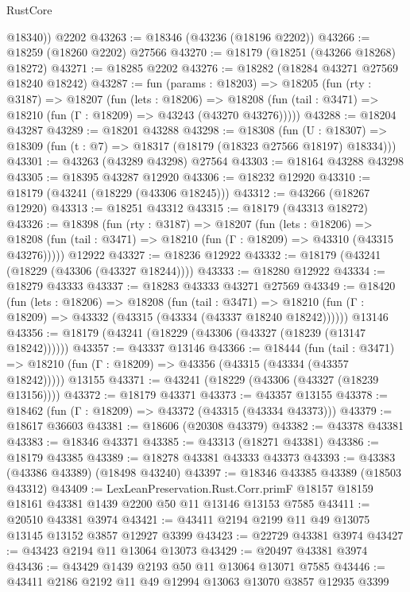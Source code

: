 \begin{lexlean}{RustCore}
\begin{coremodule}
        @18340))
    @2202
@43263 := @18346 (@43236 (@18196 @2202))
@43266 := @18259 (@18260 @2202) @27566
@43270 := @18179 (@18251 (@43266 @18268) @18272)
@43271 := @18285 @2202
@43276 := @18282 (@18284 @43271 @27569 @18240 @18242)
@43287 := fun (params : @18203) =>
  @18205
    (fun (rty : @3187) =>
    @18207
      (fun (lets : @18206) =>
      @18208 (fun (tail : @3471) => @18210 (fun (Γ : @18209) => @43243 (@43270 @43276)))))
@43288 := @18204 @43287
@43289 := @18201 @43288
@43298 := @18308
    (fun (U : @18307) => @18309 (fun (t : @7) => @18317 (@18179 (@18323 @27566 @18197) @18334)))
@43301 := @43263 (@43289 @43298) @27564
@43303 := @18164 @43288 @43298
@43305 := @18395 @43287 @12920
@43306 := @18232 @12920
@43310 := @18179 (@43241 (@18229 (@43306 @18245)))
@43312 := @43266 (@18267 @12920)
@43313 := @18251 @43312
@43315 := @18179 (@43313 @18272)
@43326 := @18398
    (fun (rty : @3187) =>
    @18207
      (fun (lets : @18206) =>
      @18208 (fun (tail : @3471) => @18210 (fun (Γ : @18209) => @43310 (@43315 @43276)))))
    @12922
@43327 := @18236 @12922
@43332 := @18179 (@43241 (@18229 (@43306 (@43327 @18244))))
@43333 := @18280 @12922
@43334 := @18279 @43333
@43337 := @18283 @43333 @43271 @27569
@43349 := @18420
    (fun (lets : @18206) =>
    @18208
      (fun (tail : @3471) =>
      @18210 (fun (Γ : @18209) => @43332 (@43315 (@43334 (@43337 @18240 @18242))))))
    @13146
@43356 := @18179 (@43241 (@18229 (@43306 (@43327 (@18239 (@13147 @18242))))))
@43357 := @43337 @13146
@43366 := @18444
    (fun (tail : @3471) => @18210 (fun (Γ : @18209) => @43356 (@43315 (@43334 (@43357 @18242)))))
    @13155
@43371 := @43241 (@18229 (@43306 (@43327 (@18239 @13156))))
@43372 := @18179 @43371
@43373 := @43357 @13155
@43378 := @18462 (fun (Γ : @18209) => @43372 (@43315 (@43334 @43373)))
@43379 := @18617 @36603
@43381 := @18606 (@20308 @43379)
@43382 := @43378 @43381
@43383 := @18346 @43371
@43385 := @43313 (@18271 @43381)
@43386 := @18179 @43385
@43389 := @18278 @43381 @43333 @43373
@43393 := @43383 (@43386 @43389) (@18498 @43240)
@43397 := @18346 @43385 @43389 (@18503 @43312)
@43409 := LexLeanPreservation.Rust.Corr.primF
    @18157
    @18159
    @18161
    @43381
    @1439
    @2200
    @50
    @11
    @13146
    @13153
    @7585
@43411 := @20510 @43381 @3974
@43421 := @43411 @2194 @2199 @11 @49 @13075 @13145 @13152 @3857 @12927 @3399
@43423 := @22729 @43381 @3974
@43427 := @43423 @2194 @11 @13064 @13073
@43429 := @20497 @43381 @3974
@43436 := @43429 @1439 @2193 @50 @11 @13064 @13071 @7585
@43446 := @43411 @2186 @2192 @11 @49 @12994 @13063 @13070 @3857 @12935 @3399

\end{coremodule}
\end{lexlean}
